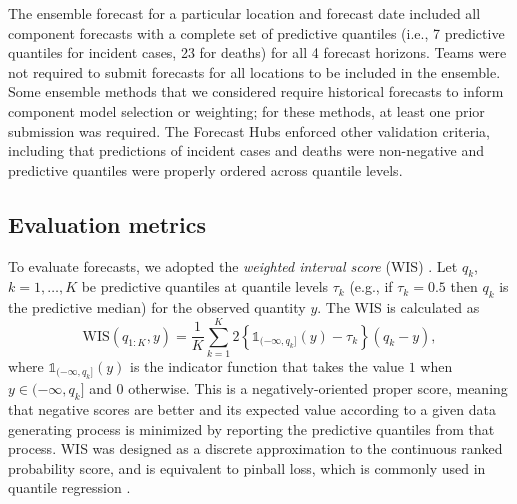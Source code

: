 \documentclass[11pt,3p,review,authoryear]{elsarticle}
\def\WIS{\mathrm{WIS}}
\begin{document}
The ensemble forecast for a particular location and forecast date included all component forecasts with a complete set of predictive quantiles (i.e., 7 predictive quantiles for incident cases, 23 for deaths) for all 4 forecast horizons. Teams were not required to submit forecasts for all locations to be included in the ensemble. Some ensemble methods that we considered require historical forecasts to inform component model selection or weighting; for these methods, at least one prior submission was required. The Forecast Hubs enforced other validation criteria, including that predictions of incident cases and deaths were non-negative and predictive quantiles were properly ordered across quantile levels.

\subsection{Evaluation metrics}
\label{subsec:methods_evaluation}

To evaluate forecasts, we adopted the \emph{weighted interval score} (WIS) \citep{bracherEvaluatingEpidemicForecasts2021}.
Let $q_k$, $k = 1, \ldots, K$ be predictive quantiles at quantile levels $\tau_k$ (e.g., if $\tau_k = 0.5$ then $q_k$ is the predictive median) for the observed quantity $y$.
The WIS is calculated as
$$\WIS(q_{1:K},y) = \frac{1}{K} \sum_{k=1}^K 2 \left\{ \mathds{1}_{(-\infty, q_k]}(y) - \tau_k \right\} (q_k - y),$$
where $\mathds{1}_{(-\infty, q_k]}(y)$ is the indicator function that takes the value $1$ when $y \in (-\infty, q_k]$ and $0$ otherwise.
This is a negatively-oriented proper score, meaning that negative scores are better and its expected value according to a given data generating process is minimized by reporting the predictive quantiles from that process. WIS was designed as a discrete approximation to the continuous ranked probability score, and is equivalent to pinball loss, which is commonly used in quantile regression \citep{bracherEvaluatingEpidemicForecasts2021}.
\end{document}
